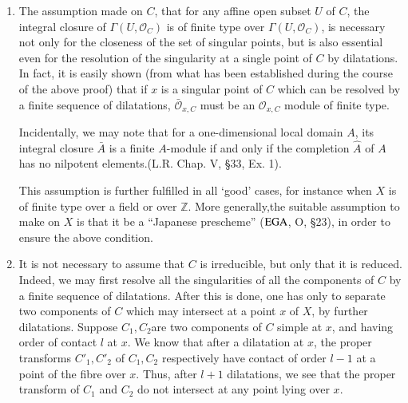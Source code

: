 \begin{remarks*}
  \begin{enumerate}[1)]
  \item The assumption  made on $C$, that for any affine open subset
    $U$ of $C$, the integral closure of $\Gamma (U, \mathscr{O}_C)$ is
    of finite type over $\Gamma (U,\mathscr{O}_C)$, is necessary not
    only for the closeness of the set of singular points, but is also
    essential even for the resolution of the singularity at a single
    point of $C$ by dilatations. In fact, it is easily shown (from what
    has been established during the course of the above proof) that if
    $x$ is a singular point of $C$ which can be resolved by a finite
    sequence of dilatations, $\bar{\mathscr{O}}_{x,C}$ must be an
    $\mathscr{O}_{x,C}$ module of finite type. 

    Incidentally, we may note that for a one-dimensional local domain
    $A$, its integral closure $\bar{A}$ is a finite $A$-module if and
    only if the completion $\hat{A}$ of $A$ has no nilpotent
    elements.(L.R. Chap. V, \S 33, Ex. 1). 

    This assumption is further fulfilled in all `good' cases, for
    instance when $X$ is of finite type over a field or over
    $\mathbb{Z}$. More generally,the suitable assumption to make on
    $X$ is that it be a {\small ``Japanese prescheme''} ($\operatorname{EGA}$, O, \S 23), in order
    to ensure the above condition. 

  \item It is not necessary to assume that $C$ is irreducible, but
    only that it is reduced. Indeed, we may first resolve all the
    singularities of all the components of $C$ by a finite sequence of
    dilatations. After this is done, one has only to separate two
    components of $C$ which may intersect at a point $x$ of $X$, by
    further dilatations. Suppose $C_1, C_2$\pageoriginale are two
    components of $C$ 
    simple at $x$, and having order of contact $l$ at $x$. We know that
    after a dilatation at $x$, the proper transforms $C'_1,C'_2$ of
    $C_1,C_2$ respectively have contact of order $l-1$ at a point of
    the fibre over $x$. Thus, after $l + 1$ dilatations, we see that
    the proper transform  of $C_1$ and $C_2$ do not intersect at any
    point lying over $x$. 
  \end{enumerate}
\end{remarks*}
